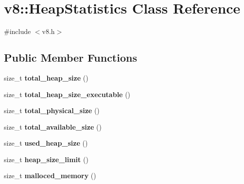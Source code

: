 \hypertarget{classv8_1_1HeapStatistics}{}\section{v8\+:\+:Heap\+Statistics Class Reference}
\label{classv8_1_1HeapStatistics}


{\ttfamily \#include $<$v8.\+h$>$}

\subsection*{Public Member Functions}
\begin{DoxyCompactItemize}
\item 
\mbox{\label{classv8_1_1HeapStatistics_ac005b9c55d5818b6969c8fd61359139b}} 
size\+\_\+t {\bfseries total\+\_\+heap\+\_\+size} ()
\item 
\mbox{\label{classv8_1_1HeapStatistics_aa935ea51c12ec64049c06b532dbb4f8d}} 
size\+\_\+t {\bfseries total\+\_\+heap\+\_\+size\+\_\+executable} ()
\item 
\mbox{\label{classv8_1_1HeapStatistics_a084994a3a5edf15b73c9b171a911a487}} 
size\+\_\+t {\bfseries total\+\_\+physical\+\_\+size} ()
\item 
\mbox{\label{classv8_1_1HeapStatistics_aa6df7f6e60766279cf4d8447a6d4d14d}} 
size\+\_\+t {\bfseries total\+\_\+available\+\_\+size} ()
\item 
\mbox{\label{classv8_1_1HeapStatistics_a05ecb48bceea49d2fe430c81df02babc}} 
size\+\_\+t {\bfseries used\+\_\+heap\+\_\+size} ()
\item 
\mbox{\label{classv8_1_1HeapStatistics_a27e5a1ba9bc8530c6bf1cf277ce3d179}} 
size\+\_\+t {\bfseries heap\+\_\+size\+\_\+limit} ()
\item 
\mbox{\label{classv8_1_1HeapStatistics_a288dcfe7dba458223d02788471990060}} 
size\+\_\+t {\bfseries malloced\+\_\+memory} ()
\item 
\mbox{\label{classv8_1_1HeapStatistics_ad6715eb716b3984b1dce5093bd1efa9e}} 

\end{DoxyCompactItemize}
